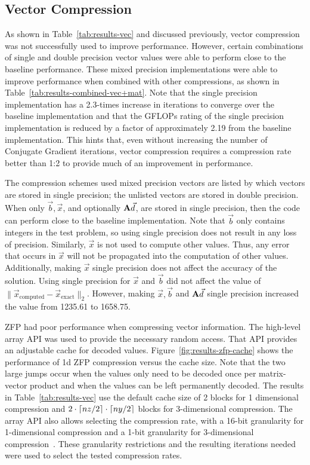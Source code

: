 \subsection{Vector Compression}
\label{sec:results-vec}
As shown in Table~\ref{tab:results-vec} and discussed previously, vector compression was not successfully used to improve performance.
However, certain combinations of single and double precision vector values were able to perform close to the baseline performance.
These mixed precision implementations were able to improve performance when combined with other compressions, as shown in Table~\ref{tab:results-combined-vec+mat}.
Note that the single precision implementation has a 2.3-times increase in iterations to converge over the baseline implementation and that the GFLOPs rating of the single precision implementation is reduced by a factor of approximately 2.19 from the baseline implementation.
This hints that, even without increasing the number of Conjugate Gradient iterations, vector compression requires a compression rate better than 1:2 to provide much of an improvement in performance.

The compression schemes used mixed precision vectors are listed by which vectors are stored in single precision; the unlisted vectors are stored in double precision.
When only \(\vec{b}, \vec{x}\), and optionally \(\mathbf{A}\vec{d}\), are stored in single precision, then the code can perform close to the baseline implementation.
Note that \(\vec{b}\) only contains integers in the test problem, so using single precision does not result in any loss of precision.
Similarly, \(\vec{x}\) is not used to compute other values.
Thus, any error that occurs in \(\vec{x}\) will not be propagated into the computation of other values.
Additionally, making \(\vec{x}\) single precision does not affect the accuracy of the solution.
Using single precision for \(\vec{x}\) and \(\vec{b}\) did not affect the value of \(\|\vec{x}_\text{computed} - \vec{x}_\text{exact}\|_2\).
However, making \(\vec{x}, \vec{b}\) and \(\mathbf{A}\vec{d}\) single precision increased the value from 1235.61 to 1658.75.

ZFP had poor performance when compressing vector information.
The high-level array API was used to provide the necessary random access.
That API provides an adjustable cache for decoded values.
Figure~\ref{fig:results-zfp-cache} shows the performance of 1d ZFP compression versus the cache size.
Note that the two large jumps occur when the values only need to be decoded once per matrix-vector product and when the values can be left permanently decoded.
The results in Table~\ref{tab:results-vec} use the default cache size of 2 blocks for 1 dimensional compression and \({2\cdot\lceil nz/2\rceil\cdot\lceil ny/2\rceil}\) blocks for 3-dimensional compression.
The array API also allows selecting the compression rate, with a 16-bit granularity for 1-dimensional compression and a 1-bit granularity for 3-dimensional compression~\cite{Lindstrom:2014:zfp}.
These granularity restrictions and the resulting iterations needed were used to select the tested compression rates.

